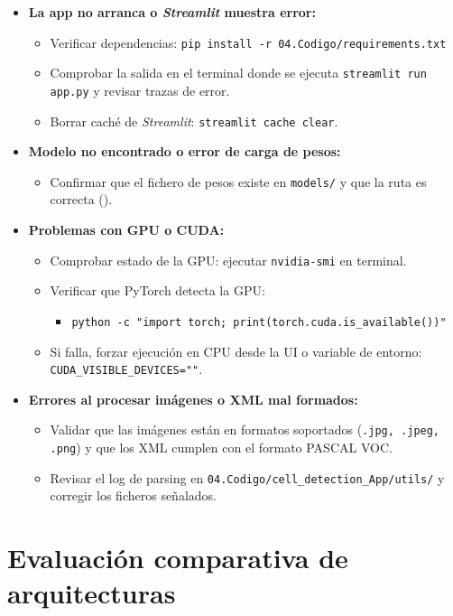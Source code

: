 \documentclass[12pt,a4paper,onecolumn,oneside]{report}
\begin{document}
\begin{itemize}
  \item \textbf{La app no arranca o \textit{Streamlit} muestra error:}
    \begin{itemize}
      \item Verificar dependencias: \texttt{pip install -r 04.Codigo/requirements.txt}
      \item Comprobar la salida en el terminal donde se ejecuta \texttt{streamlit run app.py} y revisar trazas de error.
      \item Borrar caché de \textit{Streamlit}: \texttt{streamlit cache clear}.
    \end{itemize}
  \item \textbf{Modelo no encontrado o error de carga de pesos:}
    \begin{itemize}
      \item Confirmar que el fichero de pesos existe en \texttt{models/} y que la ruta es correcta ().
    \end{itemize}
  \item \textbf{Problemas con GPU o CUDA:}
    \begin{itemize}
      \item Comprobar estado de la GPU: ejecutar \texttt{nvidia-smi} en terminal.
      \item Verificar que PyTorch detecta la GPU: 
        \begin{itemize}
          \item \texttt{python -c "import torch; print(torch.cuda.is\_available())"}
        \end{itemize}
      \item Si falla, forzar ejecución en CPU desde la UI o variable de entorno: \texttt{CUDA\_VISIBLE\_DEVICES=""}.
    \end{itemize}
  \item \textbf{Errores al procesar imágenes o XML mal formados:}
    \begin{itemize}
      \item Validar que las imágenes están en formatos soportados (\texttt{.jpg, .jpeg, .png}) y que los XML cumplen con el formato PASCAL VOC.
      \item Revisar el log de parsing en \texttt{04.Codigo/cell\_detection\_App/utils/} y corregir los ficheros señalados.
    \end{itemize}
\end{itemize}


\chapter{Evaluación comparativa de arquitecturas} %
\label{Evaluación comparativa de arquitecturas}
\end{document}
